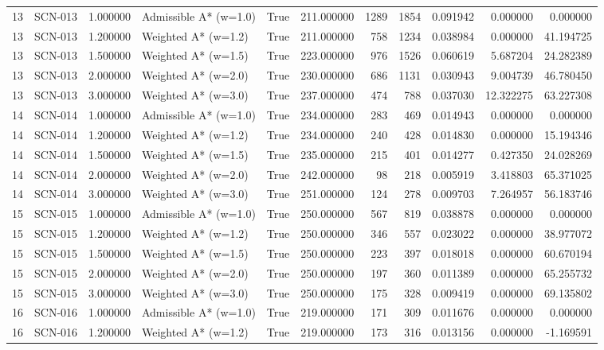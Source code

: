 \begin{table}[htbp]
\begin{tabular}{rlrlrrrrrrr}
13 & SCN-013 & 1.000000 & Admissible A* (w=1.0) & True & 211.000000 & 1289 & 1854 & 0.091942 & 0.000000 & 0.000000 \\
13 & SCN-013 & 1.200000 & Weighted A* (w=1.2) & True & 211.000000 & 758 & 1234 & 0.038984 & 0.000000 & 41.194725 \\
13 & SCN-013 & 1.500000 & Weighted A* (w=1.5) & True & 223.000000 & 976 & 1526 & 0.060619 & 5.687204 & 24.282389 \\
13 & SCN-013 & 2.000000 & Weighted A* (w=2.0) & True & 230.000000 & 686 & 1131 & 0.030943 & 9.004739 & 46.780450 \\
13 & SCN-013 & 3.000000 & Weighted A* (w=3.0) & True & 237.000000 & 474 & 788 & 0.037030 & 12.322275 & 63.227308 \\
14 & SCN-014 & 1.000000 & Admissible A* (w=1.0) & True & 234.000000 & 283 & 469 & 0.014943 & 0.000000 & 0.000000 \\
14 & SCN-014 & 1.200000 & Weighted A* (w=1.2) & True & 234.000000 & 240 & 428 & 0.014830 & 0.000000 & 15.194346 \\
14 & SCN-014 & 1.500000 & Weighted A* (w=1.5) & True & 235.000000 & 215 & 401 & 0.014277 & 0.427350 & 24.028269 \\
14 & SCN-014 & 2.000000 & Weighted A* (w=2.0) & True & 242.000000 & 98 & 218 & 0.005919 & 3.418803 & 65.371025 \\
14 & SCN-014 & 3.000000 & Weighted A* (w=3.0) & True & 251.000000 & 124 & 278 & 0.009703 & 7.264957 & 56.183746 \\
15 & SCN-015 & 1.000000 & Admissible A* (w=1.0) & True & 250.000000 & 567 & 819 & 0.038878 & 0.000000 & 0.000000 \\
15 & SCN-015 & 1.200000 & Weighted A* (w=1.2) & True & 250.000000 & 346 & 557 & 0.023022 & 0.000000 & 38.977072 \\
15 & SCN-015 & 1.500000 & Weighted A* (w=1.5) & True & 250.000000 & 223 & 397 & 0.018018 & 0.000000 & 60.670194 \\
15 & SCN-015 & 2.000000 & Weighted A* (w=2.0) & True & 250.000000 & 197 & 360 & 0.011389 & 0.000000 & 65.255732 \\
15 & SCN-015 & 3.000000 & Weighted A* (w=3.0) & True & 250.000000 & 175 & 328 & 0.009419 & 0.000000 & 69.135802 \\
16 & SCN-016 & 1.000000 & Admissible A* (w=1.0) & True & 219.000000 & 171 & 309 & 0.011676 & 0.000000 & 0.000000 \\
16 & SCN-016 & 1.200000 & Weighted A* (w=1.2) & True & 219.000000 & 173 & 316 & 0.013156 & 0.000000 & -1.169591 \\

\end{tabular}
\end{table}
